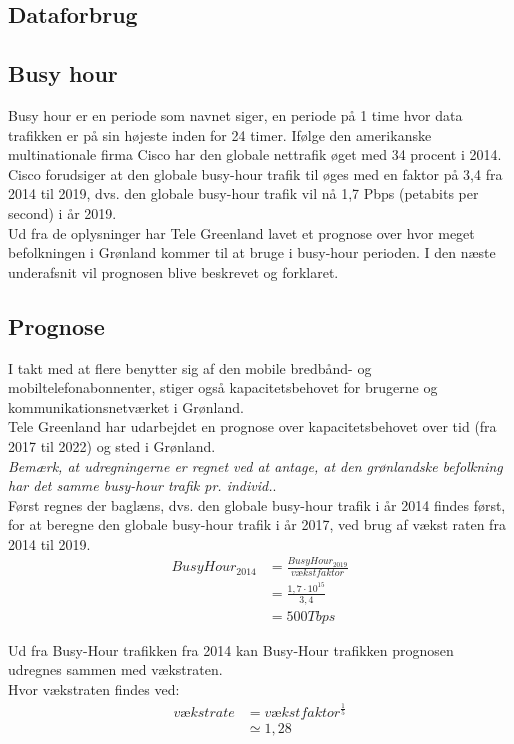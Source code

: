 \subsection{Dataforbrug}

\subsection{Busy hour}
Busy hour er en periode som navnet siger, en periode på 1 time hvor data trafikken er på sin højeste inden for 24 timer. Ifølge den amerikanske multinationale firma Cisco har den globale nettrafik øget med 34 procent i 2014. Cisco forudsiger at den globale busy-hour trafik til øges med en faktor på 3,4 fra 2014 til 2019, dvs. den globale busy-hour trafik vil nå 1,7 Pbps (petabits per second) i år 2019\cite{busy-hour}.\\
Ud fra de oplysninger har Tele Greenland lavet et prognose over hvor meget befolkningen i Grønland kommer til at bruge i busy-hour perioden. I den næste underafsnit vil prognosen blive beskrevet og forklaret.

\subsection{Prognose}
I takt med at flere benytter sig af den mobile bredbånd- og mobiltelefonabonnenter, stiger også kapacitetsbehovet for brugerne og kommunikationsnetværket i Grønland.\\
Tele Greenland har udarbejdet en prognose over kapacitetsbehovet over tid (fra 2017 til 2022) og sted i Grønland.\\
\textit{Bemærk, at udregningerne er regnet ved at antage, at den grønlandske befolkning har det samme busy-hour trafik pr. individ.}.\\
Først regnes der baglæns, dvs. den globale busy-hour trafik i år 2014 findes først, for at beregne den globale busy-hour trafik i år 2017, ved brug af vækst raten fra 2014 til 2019.\\

\begin{align}
	Busy Hour_{2014}& = \frac{Busy Hour_{2019}}{vækstfaktor} \nonumber\\
	&= \frac{1,7 \cdot 10^{15}}{3,4} \nonumber\\
	&= 500 Tbps
\end{align}

Ud fra Busy-Hour trafikken fra 2014 kan Busy-Hour trafikken prognosen udregnes sammen med vækstraten.\\ Hvor vækstraten findes ved:
\begin{align}
	vækstrate &= vækstfaktor^\frac{1}{5} \nonumber\\
	&\simeq 1,28
\end{align}

